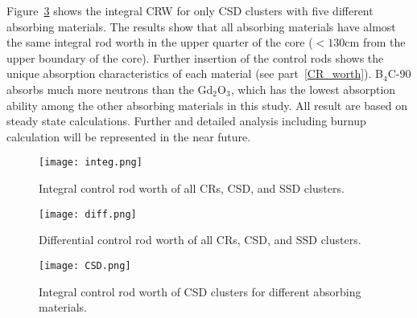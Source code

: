 Figure~\ref{fig:CSD} shows the integral CRW for only CSD clusters with five 
different absorbing materials. The results show that all absorbing materials 
have almost the same integral rod worth in the upper quarter of the core 
($<130$cm from the upper boundary of the core). Further insertion of the 
control rods shows the unique absorption characteristics of each material (see 
part~\ref{CR_worth}). B$_4$C-90 absorbs much more neutrons than the 
Gd$_2$O$_3$, which has the lowest absorption ability among the other absorbing 
materials in this study. All result are based on steady state calculations. 
Further and detailed analysis including burnup calculation will be represented 
in the near future.
\begin{figure}
	\centering
	\texttt{[image: integ.png]}
	\vspace{-0.5in}
	\caption{Integral control rod worth of all CRs, CSD, and SSD clusters.} 
	\label{fig:integ}
\end{figure}
\begin{figure}
	\centering
	\texttt{[image: diff.png]}
	\vspace{-0.5in}
	\caption{Differential control rod worth of all CRs, CSD, and SSD clusters.} 
	\label{fig:diff}
\end{figure}
\begin{figure}
	\centering
	\texttt{[image: CSD.png]}
	\vspace{-0.5in}
	\caption{Integral control rod worth of CSD clusters for different absorbing materials.} 
	\label{fig:CSD}
\end{figure}